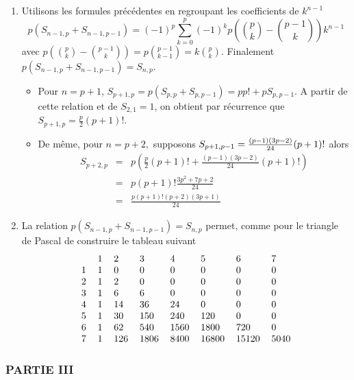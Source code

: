 \begin{enumerate}
\item  Utilisons les formules pr{\'e}c{\'e}dentes en regroupant les
coefficients de $k^{n-1}$
\[
p(S_{n-1,p}+S_{n-1,p-1})=(-1)^{p}\sum_{k=0}^{p}(-1)^{k}p\left( \binom{p}{k}-%
\binom{p-1}{k}\right) k^{n-1}
\]
avec $p\left( \binom{p}{k}-\binom{p-1}{k}\right) =p\binom{p-1}{k-1}=k\binom{p%
}{k}.$ Finalement $p(S_{n-1,p}+S_{n-1,p-1})=S_{n,p}$.

\begin{itemize}
\item  Pour $n=p+1$, $S_{p+1,p}=p(S_{p,p}+S_{p,p-1})=pp!+pS_{p,p-1}$. A
partir de cette relation et de $S_{2,1}=1$, on obtient par
r{\'e}currence que $S_{p+1,p}=\frac{p}{2}(p+1)!$.

\item  De m{\^e}me, pour $n=p+2,$ supposons $S_{p+1,p-1}=\frac{(p-1)(3p-2)}{%
24}(p+1)!$ alors
\begin{eqnarray*}
S_{p+2,p}&=&p\left(
\frac{p}{2}(p+1)!+\frac{(p-1)(3p-2)}{24}(p+1)!\right)\\
&=&p(p+1)!\frac{3p^{2}+7p+2}{24}\\
&=&\frac{p(p+1)!(p+2)(3p+1)}{24}
\end{eqnarray*}
\end{itemize}

\item  La relation $p(S_{n-1,p}+S_{n-1,p-1})=S_{n,p}$ permet, comme pour le
triangle de Pascal de construire le tableau suivant
\[
\begin{tabular}{llllllll}
& 1 & 2 & 3 & 4 & 5 & 6 & 7 \\
1 & 1 & 0 & 0 & 0 & 0 & 0 & 0 \\
2 & 1 & 2 & 0 & 0 & 0 & 0 & 0 \\
3 & 1 & 6 & 6 & 0 & 0 & 0 & 0 \\
4 & 1 & 14 & 36 & 24 & 0 & 0 & 0 \\
5 & 1 & 30 & 150 & 240 & 120 & 0 & 0 \\
6 & 1 & 62 & 540 & 1560 & 1800 & 720 & 0 \\
7 & 1 & 126 & 1806 & 8400 & 16800 & 15120 & 5040
\end{tabular}
\]
\end{enumerate}

\subsubsection*{PARTIE III}


